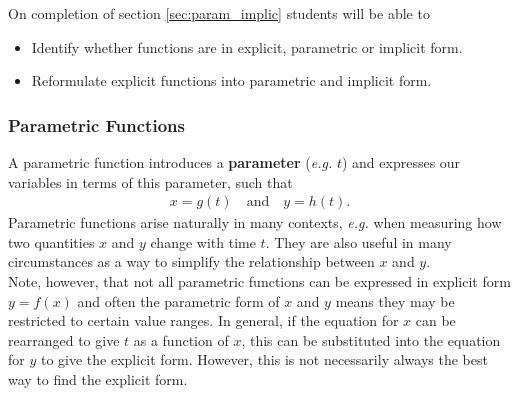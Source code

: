 \begin{learningoutcomes}
On completion of section \ref{sec:param_implic} students will be able to
\begin{itemize}
    \item Identify whether functions are in explicit, parametric or implicit form.
    \item Reformulate explicit functions into parametric and implicit form.
\end{itemize}
\end{learningoutcomes}

\subsubsection{Parametric Functions}

A parametric function introduces a \textbf{parameter} (\textit{e.g.} $t$) and expresses our variables in terms of this parameter, such that 
\begin{align}
    x = g(t) \quad \mathrm{and} \quad y = h(t). 
\end{align}
Parametric functions arise naturally in many contexts, \textit{e.g.} when measuring how two quantities $x$ and $y$ change with time $t$. They are also useful in many circumstances as a way to simplify the relationship between $x$ and $y$.\\

Note, however, that not all parametric functions can be expressed in explicit form $y = f(x)$ and often the parametric form of $x$ and $y$ means they may be restricted to certain value ranges. In general, if the equation for $x$ can be rearranged to give $t$ as a function of $x$, this can be substituted into the equation for $y$ to give the explicit form. However, this is not necessarily always the best way to find the explicit form.\\

